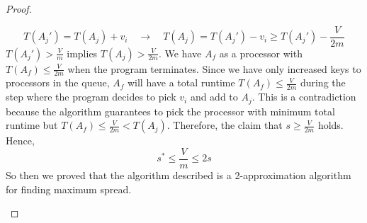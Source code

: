 \documentclass[11pt]{article}
\begin{document}
\begin{enumerate}
\begin{solution}
\begin{proof}
\begin{enumerate}
                \[
                T(A_j') = T(A_j) + v_i \quad \to  \quad T(A_j) = T(A_j') - v_i \geq T(A_j') - \frac{V}{2m}
                \]
                $T(A_j') > \frac{V}{m}$ implies $T(A_j) > \frac{V}{2m}$. We have $A_f$ as a processor with $T(A_f) \leq \frac{V}{2m}$ when the program terminates. Since we have only increased keys to processors in the queue, $A_f$ will have a total runtime $T(A_f) \leq \frac{V}{2m}$ during the step where the program decides to pick $v_i$ and add to $A_j$. This is a contradiction because the algorithm guarantees to pick the processor with minimum total runtime but $T(A_f) \leq \frac{V}{2m} < T(A_j)$. Therefore, the claim that $s \geq \frac{V}{2m}$ holds. Hence,
                \[
                    s^* \leq \frac{V}{m} \leq 2s
                \]
                So then we proved that the algorithm described is a 2-approximation algorithm for finding maximum spread. 
            \end{enumerate}


            
        \end{proof}
        

    \end{solution}

\end{enumerate}
\end{document}
